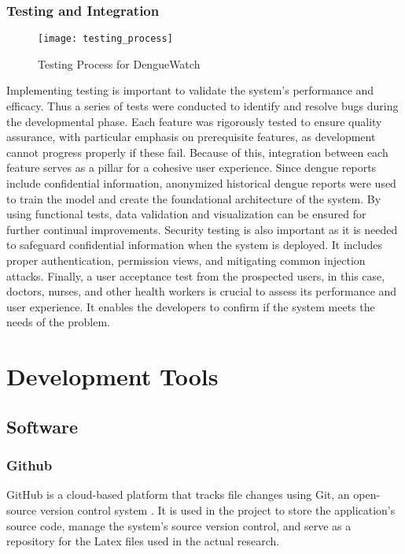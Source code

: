 \subsubsection{Testing and Integration}
\begin{figure}[H]
	\centering
	\texttt{[image: testing\_process]}
	\caption{Testing Process for DengueWatch}
	\label{fig:testing-process}
\end{figure}

Implementing testing is important to validate the system's performance and efficacy. Thus a series of tests were conducted to identify and resolve bugs during the developmental phase. Each feature was rigorously tested to ensure quality assurance, with particular emphasis on prerequisite features, as development cannot progress properly if these fail. Because of this, integration between each feature serves as a pillar for a cohesive user experience. Since dengue reports include confidential information, anonymized historical dengue reports were used to train the model and create the foundational architecture of the system. By using functional tests, data validation and visualization can be ensured for further continual improvements. Security testing is also important as it is needed to safeguard confidential information when the system is deployed. It includes proper authentication, permission views, and mitigating common injection attacks. Finally, a user acceptance test from the prospected users, in this case, doctors, nurses, and other health workers is crucial to assess its performance and user experience. It enables the developers to confirm if the system meets the needs of the problem.

\section{Development Tools}
\subsection{Software}

\subsubsection{Github}
GitHub is a cloud-based platform that tracks file changes using Git, an open-source version control system \cite{github-no-date}. It is used in the project to store the application's source code, manage the system's source version control, and serve as a repository for the Latex files used in the actual research.

